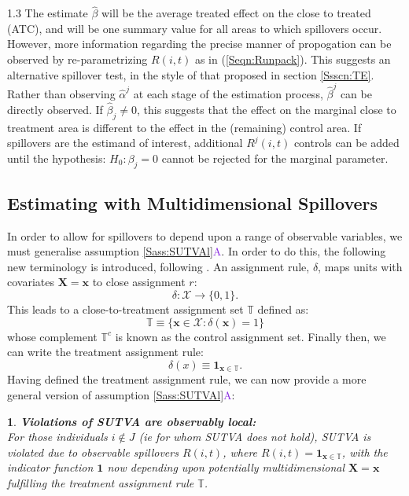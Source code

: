 \documentclass{article}
\makeatletter
\newtheorem*{assumption*}{\assumptionnumber}
\providecommand{\assumptionnumber}{}
\newenvironment{assumption}[2]
 {%
  \renewcommand{\assumptionnumber}{Assumption #1{#2}}%
  \begin{assumption*}%
  \protected@edef\@currentlabel{#1}%
 }
 {%
  \end{assumption*}
 }
\newcommand{\asref}[2]{\ref{#1}{\textcolor{BlueViolet}{#2}}}
\makeatother
\begin{document}
\begin{spacing}{1.3}
The estimate $\hat\beta$ will be the average treated effect on the close to treated
(ATC), and will be one summary value for all areas to which spillovers occur.  
However, more information regarding the precise manner of propogation can be observed
by re-parametrizing $R(i,t)$ as in (\ref{Seqn:Runpack}).  This suggests an 
alternative spillover test, in the style of that proposed in section \ref{Ssscn:TE}.
Rather than observing $\hat\alpha^j$ at each stage of the estimation process, 
$\hat\beta^j$ can be directly observed.  If $\hat\beta_j\neq 0$, this suggests that
the effect on the marginal close to treatment area is different to the effect in 
the (remaining) control area.  If spillovers are the estimand of interest, 
additional $R^j(i,t)$ controls can be added until the hypothesis: $H_0: \beta_j = 0$ 
cannot be rejected for the marginal parameter.

\subsection{Estimating with Multidimensional Spillovers}
\label{Ssscn:multi}
In order to allow for spillovers to depend upon a range of observable variables,
we must generalise assumption \asref{Sass:SUTVAl}{A}.  In order to do this, the
following new terminology is introduced, following \citet{Zajonc2012}. An 
assignment rule, $\delta$, maps units with covariates $\mathbf{X=x}$ to close
assignment $r$:
\[
\delta: \mathcal{X} \rightarrow \{0,1\}.
\]
This leads to a close-to-treatment assignment set $\mathbb{T}$ defined as:
\[
\mathbb{T}\equiv \{ \mathbf{x}\in\mathcal{X}: \delta(\mathbf{x})=1 \}
\]
whose complement $\mathbb{T}^c$ is known as the control assignment
set. Finally then, we can write the treatment assignment rule:
\begin{equation}
\delta(x)\equiv \mathbf{1}_{\mathbf{x}\in\mathbb{T}}.
\end{equation}
Having defined the treatment assignment rule, we can now provide a
more general version of assumption \asref{Sass:SUTVAl}{A}:

\begin{assumption}{4}{B}
\label{Sass:SUTVAlM}
\textbf{Violations of SUTVA are observably local:} \\ 
For those individuals $i\notin J$ (ie for whom SUTVA does not hold), SUTVA is
violated due to observable spillovers $R(i,t)$, where 
$R(i,t)=\mathbf{1}_{\mathbf{x}\in \mathbb{T}}$, with the indicator function 
$\mathbf{1}$ now depending upon potentially multidimensional
$\mathbf{X=x}$
fulfilling the treatment assignment rule $\mathbb{T}$.
\end{assumption}


\end{spacing}
\end{document}
